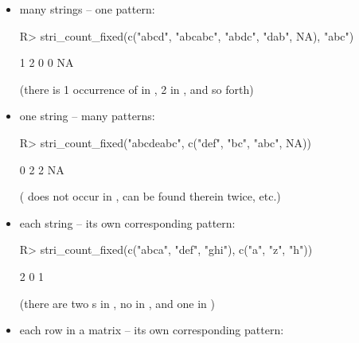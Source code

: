 \documentclass[nojss]{jss}
\begin{document}
\begin{itemize}
\item many strings -- one pattern:

\begin{Schunk}
\begin{Sinput}
R> stri_count_fixed(c("abcd", "abcabc", "abdc", "dab", NA), "abc")
\end{Sinput}
\begin{Soutput}
[1]  1  2  0  0 NA
\end{Soutput}
\end{Schunk}

(there is 1 occurrence of  in ,
2 in , and so forth)

\item one string -- many patterns:

\begin{Schunk}
\begin{Sinput}
R> stri_count_fixed("abcdeabc", c("def", "bc", "abc", NA))
\end{Sinput}
\begin{Soutput}
[1]  0  2  2 NA
\end{Soutput}
\end{Schunk}

( does not occur in ,
 can be found therein twice, etc.)

\item each string -- its own corresponding pattern:

\begin{Schunk}
\begin{Sinput}
R> stri_count_fixed(c("abca", "def", "ghi"), c("a", "z", "h"))
\end{Sinput}
\begin{Soutput}
[1] 2 0 1
\end{Soutput}
\end{Schunk}

(there are two s in ,
no  in , and one  in )

\item each row in a matrix -- its own corresponding pattern:


\end{itemize}
\end{document}
